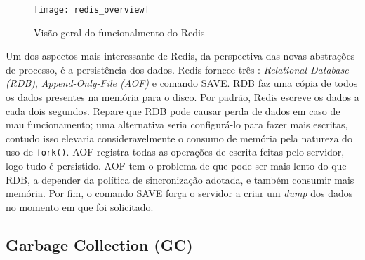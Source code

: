 \begin{figure}[!h]
  \centering
  \texttt{[image: redis\_overview]}
  \caption{Visão geral do funcionalmento do Redis}
  \label{fig:redis}
\end{figure}

Um dos aspectos mais interessante de Redis, da perspectiva das novas abstrações
de processo, é a persistência dos dados. Redis fornece três 
\citep{redisio}: \emph{Relational Database (RDB)}, \emph{Append-Only-File
(AOF)} e comando SAVE. RDB faz uma cópia de todos os dados presentes na
memória para o disco. Por padrão, Redis escreve os dados a cada dois
segundos. Repare que RDB pode causar perda de dados em caso de mau funcionamento;
uma alternativa seria configurá-lo para fazer mais escritas, contudo isso
elevaria consideravelmente o consumo de memória pela natureza do uso de
\texttt{fork()}. AOF registra todas as operações de escrita feitas pelo
servidor, logo tudo é persistido. AOF tem o problema de que pode ser mais
lento do que RDB, a depender da política de sincronização adotada, e também
consumir mais memória.  Por fim, o comando SAVE força o servidor a criar um
\emph{dump} dos dados no momento em que foi solicitado.



\subsection{Garbage Collection (GC)}
\label{sec:gc}

